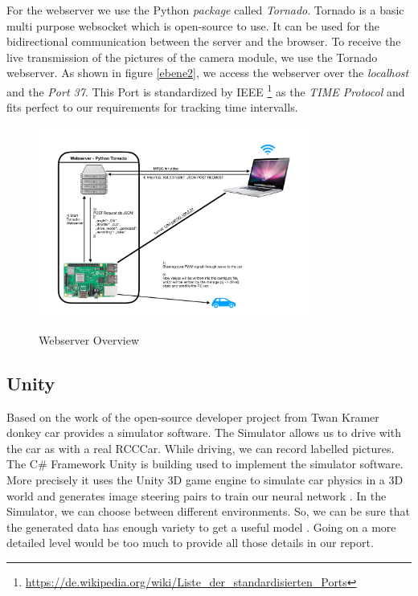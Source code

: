 \documentclass[journal]{IEEEtran}
\begin{document}
For the webserver we use the Python \textit{package} called \textit{Tornado}. Tornado is a basic multi purpose websocket which is open-source to use. It can be used for the bidirectional communication between the server and the browser. To receive the live transmission of the pictures of the camera module, we use the Tornado webserver. As shown in figure \ref{ebene2}, we access the webserver over the \textit{localhost} and the \textit{Port 37}. This Port is standardized by IEEE \footnote{\url{https://de.wikipedia.org/wiki/Liste_der_standardisierten_Ports}} as the \textit{TIME Protocol} and fits perfect to our requirements for tracking time intervalls.

\begin{figure}
  \begin{center}
  \includegraphics[width=3.5in]{photo/webserver.pdf}\\
  \caption{Webserver Overview}\label{webserver}
  \end{center}
\end{figure}

\subsection{Unity}

Based on the work of the open-source developer project from Twan Kramer donkey car provides a simulator software. The Simulator allows us to drive with the car as with a real RCC\-Car. While driving, we can record labelled pictures. The C\# Framework Unity is building used to implement the simulator software. More precisely it uses the Unity 3D game engine to simulate car physics in a 3D world and generates image steering pairs to train our neural network \cite{sdsandbox}. In the Simulator, we can choose between different environments. So, we can be sure that the generated data has enough variety to get a useful model \cite{contributionOfVariables}. Going on a more detailed level would be too much to provide all those details in our report. 
\end{document}
